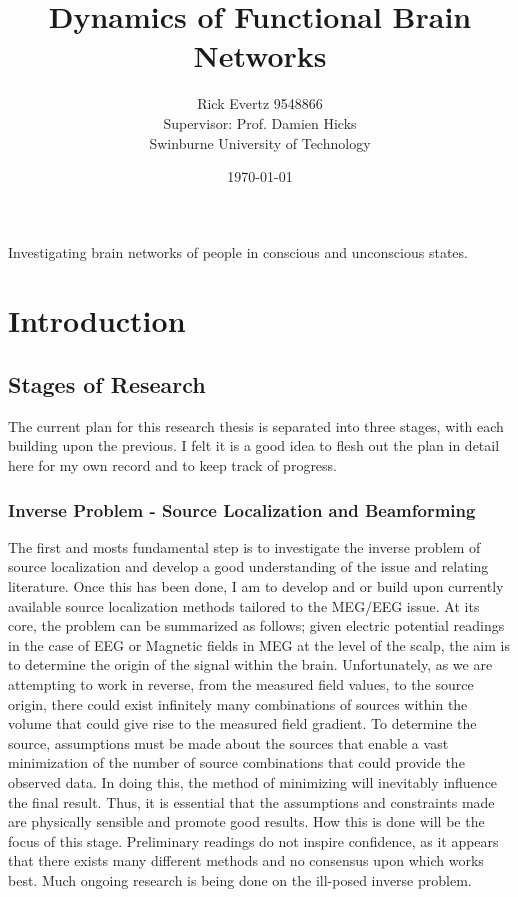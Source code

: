 \documentclass{article}
\def\ni{\noindent}
\begin{document}
\title{\bf{Dynamics of Functional Brain Networks}}
\author{Rick Evertz 9548866\\
Supervisor: Prof. Damien Hicks\\
Swinburne University of Technology}
\date{\today}
\maketitle
\abstract 
\ni Investigating brain networks of people in conscious and unconscious states.
\pagebreak

\tableofcontents
\pagebreak
\section{Introduction}
\subsection{Stages of Research}
The current plan for this research thesis is separated into three stages, with each building upon the previous. I felt it is a good idea to flesh out the plan in detail here for my own record and to keep track of progress.
\subsubsection{Inverse Problem - Source Localization and Beamforming}
The first and mosts fundamental step is to investigate the inverse problem of source localization and develop a good understanding of the issue and relating literature. Once this has been done, I am to develop and or build upon currently available source localization methods tailored to the MEG/EEG issue. At its core, the problem can be summarized as follows; given electric potential readings in the case of EEG or Magnetic fields in MEG at the level of the scalp, the aim is to determine the origin of the signal within the brain. Unfortunately, as we are attempting to work in reverse, from the measured field values, to the source origin, there could exist infinitely many combinations of sources within the volume that could give rise to the measured field gradient. To determine the source, assumptions must be made about the sources that enable a vast minimization of the number of source combinations that could provide the observed data. In doing this, the method of minimizing will inevitably influence the final result. Thus, it is essential that the assumptions and constraints made are physically sensible and promote good results. How this is done will be the focus of this stage. Preliminary readings do not inspire confidence, as it appears that there exists many different methods and no consensus upon which works best. Much ongoing research is being done on the ill-posed inverse problem.
\end{document}
